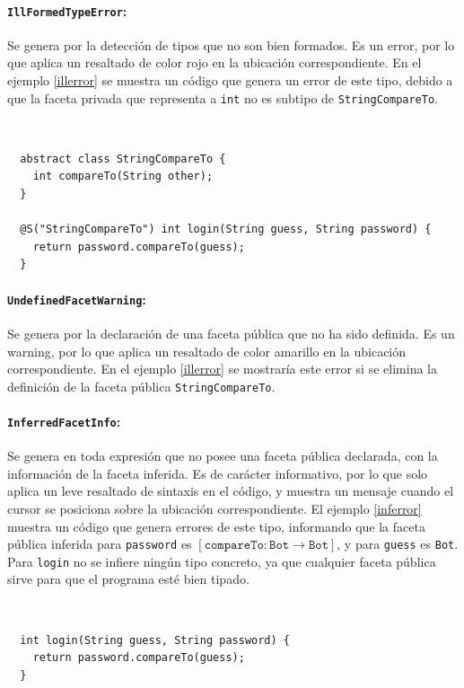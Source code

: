 \paragraph{\texttt{IllFormedTypeError}:}Se genera por la detección de tipos que no son bien formados. Es un error, por lo que aplica un resaltado de color rojo en la ubicación correspondiente. En el ejemplo \ref{illerror} se muestra un código que genera un error de este tipo, debido a que la faceta privada que representa a \texttt{int} no es subtipo de \texttt{StringCompareTo}.
\clearpage
\begin{ej}\ \\
  \label{illerror}
  \normalfont
  \begin{lstlisting}
  abstract class StringCompareTo {
    int compareTo(String other);
  }

  @S("StringCompareTo") int login(String guess, String password) {
    return password.compareTo(guess);
  }
  \end{lstlisting}
\end{ej}

\paragraph{\texttt{UndefinedFacetWarning}:}Se genera por la declaración de una faceta pública que no ha sido definida. Es un warning, por lo que aplica un resaltado de color amarillo en la ubicación correspondiente. En el ejemplo \ref{illerror} se mostraría este error si se elimina la definición de la faceta pública \texttt{StringCompareTo}.

\paragraph{\texttt{InferredFacetInfo}:}Se genera en toda expresión que no posee una faceta pública declarada, con la información de la faceta inferida. Es de carácter informativo, por lo que solo aplica un leve resaltado de sintaxis en el código, y muestra un mensaje cuando el cursor se posiciona sobre la ubicación correspondiente. El ejemplo \ref{inferror} muestra un código que genera errores de este tipo, informando que la faceta pública inferida para \texttt{password} es $\mathtt{[compareTo: Bot \rightarrow Bot]}$, y para \texttt{guess} es \texttt{Bot}. Para \texttt{login} no se infiere ningún tipo concreto, ya que cualquier faceta pública sirve para que el programa esté bien tipado.

\begin{ej}\ \\
  \label{inferror}
  \normalfont
  \begin{lstlisting}
  int login(String guess, String password) {
    return password.compareTo(guess);
  }
  \end{lstlisting}
\end{ej}

